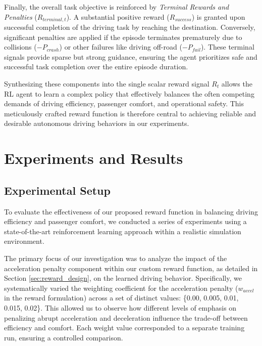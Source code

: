 \documentclass[12pt,a4paper]{article}
\begin{document}
Finally, the overall task objective is reinforced by \textit{Terminal Rewards and Penalties} (\( R_{terminal, t} \)). A substantial positive reward (\( R_{success} \)) is granted upon successful completion of the driving task by reaching the destination. Conversely, significant penalties are applied if the episode terminates prematurely due to collisions (\( -P_{crash} \)) or other failures like driving off-road (\( -P_{fail} \)). These terminal signals provide sparse but strong guidance, ensuring the agent prioritizes safe and successful task completion over the entire episode duration.

Synthesizing these components into the single scalar reward signal \( R_t \) allows the RL agent to learn a complex policy that effectively balances the often competing demands of driving efficiency, passenger comfort, and operational safety. This meticulously crafted reward function is therefore central to achieving reliable and desirable autonomous driving behaviors in our experiments.

\section{Experiments and Results}
\subsection{Experimental Setup}

To evaluate the effectiveness of our proposed reward function in balancing driving efficiency and passenger comfort, we conducted a series of experiments using a state-of-the-art reinforcement learning approach within a realistic simulation environment. 

The primary focus of our investigation was to analyze the impact of the acceleration penalty component within our custom reward function, as detailed in Section \ref{sec:reward_design}, on the learned driving behavior. Specifically, we systematically varied the weighting coefficient for the acceleration penalty (\(w_{accel}\) in the reward formulation) across a set of distinct values: \{0.00, 0.005, 0.01, 0.015, 0.02\}. This allowed us to observe how different levels of emphasis on penalizing abrupt acceleration and deceleration influence the trade-off between efficiency and comfort. Each weight value corresponded to a separate training run, ensuring a controlled comparison.
\end{document}
